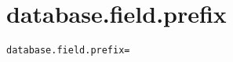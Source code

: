 \section{database.field.prefix}
\label{configuration:DatabaseFieldPrefix}
\AvailableInJavaOnly{\TODO}
\begin{lstlisting}[style=Props,caption={Usage example for \textit{database.field.prefix}}]
database.field.prefix=
\end{lstlisting}